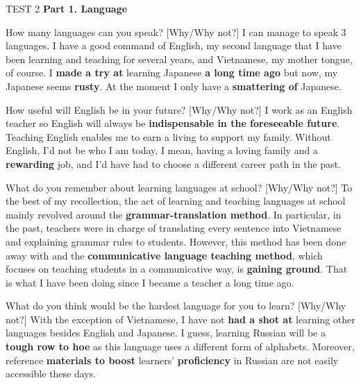 \begin{glossarymc}[Cambridge 15]
    \begin{test}{TEST 2}
    \noindent
    \textbf{Part 1. Language}
    \begin{qa}{How many languages can you speak? [Why/Why not?]}
    I can manage to speak 3 languages. I have a good command of English, my second language that I have been learning and teaching for several years, and Vietnamese, my mother tongue, of course. I \textbf{made a try at} learning Japanese \textbf{a long time ago} but now, my Japanese seems \textbf{rusty}. At the moment I only have a \textbf{smattering of} Japanese.
    \end{qa}

    \begin{qa}{How useful will English be in your future? [Why/Why not?]}
    I work as an English teacher so English will always be \textbf{indispensable in the foreseeable future}. Teaching English enables me to earn a living to support my family. Without English, I’d not be who I am today, I mean, having a loving family and a \textbf{rewarding} job, and I’d have had to choose a different career path in the past.
    \end{qa}

    \begin{qa}{What do you remember about learning languages at school? [Why/Why not?]}
    To the best of my recollection, the act of learning and teaching languages at school mainly revolved around the \textbf{grammar-translation method}. In particular, in the past, teachers were in charge of translating every sentence into Vietnamese and explaining grammar rules to students. However, this method has been done away with and the \textbf{communicative language teaching method}, which focuses on teaching students in a communicative way, is \textbf{gaining ground}. That is what I have been doing since I became a teacher a long time ago.
    \end{qa}

    \begin{qa}{What do you think would be the hardest language for you to learn? [Why/Why not?]}
    With the exception of Vietnamese, I have not \textbf{had a shot at} learning other languages besides English and Japanese. I guess, learning Russian will be a \textbf{tough row to hoe} as this language uses a different form of alphabets. Moreover, reference \textbf{materials to boost} learners’ \textbf{proficiency} in Russian are not easily accessible these days.
    \end{qa}


\end{test}
\end{glossarymc}
